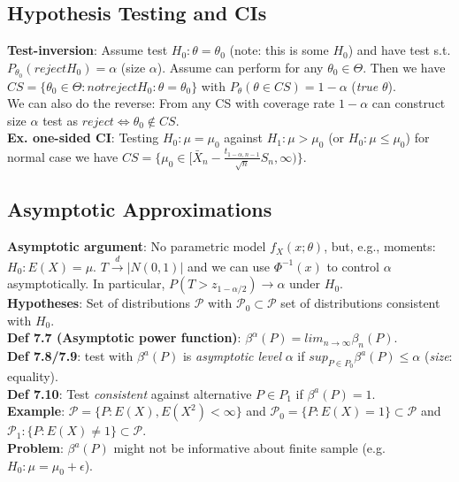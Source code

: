 \subsection{Hypothesis Testing and CIs}
\textbf{Test-inversion}: Assume test $H_0: \theta = \theta_0$ (note: this is some $H_0$) and have test s.t. $P_{\theta_0}(reject H_0) = \alpha$ (size $\alpha$). Assume can perform for any $\theta_0 \in \Theta$. Then we have $CS = \{\theta_0\in\Theta: not reject H_0: \theta=\theta_0\}$ with $P_\theta(\theta\in CS) = 1-\alpha$ (\textit{true} $\theta$).\\
We can also do the reverse: From any CS with coverage rate $1-\alpha$ can construct size $\alpha$ test as $reject\Leftrightarrow \theta_0\notin CS$.\\
\textbf{Ex. one-sided CI}: Testing $H_0: \mu = \mu_0$ against $H_1:\mu>\mu_0$ (or $H_0: \mu \leq \mu_0$) for normal case we have $CS = \{\mu_0 \in [\bar{X}_n - \frac{t_{1-\alpha, n-1}}{\sqrt{n}}S_n, \infty)\}$.

\subsection{Asymptotic Approximations}
\textbf{Asymptotic argument}: No parametric model $f_X(x;\theta)$, but, e.g., moments: $H_0: E(X) = \mu$. $T\xrightarrow{d}|N(0,1)|$ and we can use $\Phi^{-1}(x)$ to control $\alpha$ asymptotically. In particular, $P(T>z_{1-\alpha/2})\rightarrow \alpha$ under $H_0$.\\ 
\textbf{Hypotheses}: Set of distributions $\mathcal{P}$ with $\mathcal{P}_0\subset\mathcal{P}$ set of distributions consistent with $H_0$.\\
\textbf{Def 7.7 (Asymptotic power function)}: $\beta^\alpha(P) = lim_{n\to\infty}\beta_n(P)$.\\
\textbf{Def 7.8/7.9}: test with $\beta^a(P)$ is \emph{asymptotic level} $\alpha$ if $sup_{P\in P_0}\beta^a(P)\leq\alpha$ (\emph{size}: equality).\\
\textbf{Def 7.10}: Test \emph{consistent} against alternative $P\in P_1$ if $\beta^a(P) = 1$.\\
\textbf{Example}: $\mathcal{P} = \{P: E(X), E(X^2) < \infty\}$ and $\mathcal{P}_0 = \{P: E(X) = 1\} \subset \mathcal{P}$ and $\mathcal{P}_1: \{P: E(X) \neq 1\} \subset \mathcal{P}$.\\
\textbf{Problem}: $\beta^a(P)$ might not be informative about finite sample (e.g. $H_0:\mu=\mu_0+\epsilon$). 